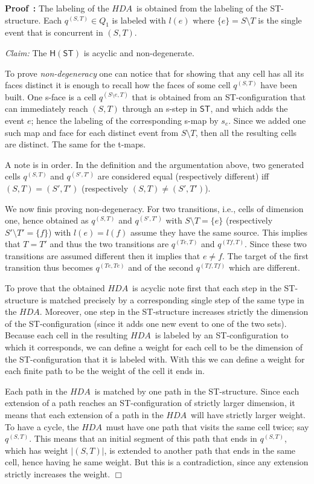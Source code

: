 \documentclass[submission,copyright,creativecommons]{eptcs}
\newenvironment{proof}[1][\!\!\,]{\vspace{1ex}\noindent\textbf{Proof #1: }}{\hfill$\Box$\vspace{2ex}}
\newcommand\HDA{\ensuremath{\mathit{HDA}}}
\newcommand\ST{\ensuremath{\mathsf{ST}}}
\newcommand\stintoh{\ensuremath{\mathsf{H}}}
\begin{document}
\begin{proof}
The labeling of the \HDA\ is obtained from the labeling of the ST-structure. Each $q^{(S,T)}\in Q_{1}$ is labeled with $l(e)$ where $\{e\}=S\setminus T$ is the single event that is concurrent in $(S,T)$.

\vspace{1ex}
\noindent\textit{Claim:}\hspace{1ex} The $\stintoh(\ST)$ is acyclic and non-degenerate.
\vspace{0.5ex}

To prove \textit{non-degeneracy} one can notice that for showing that any cell has all its faces distinct it is enough to recall how the faces of some cell $q^{(S,T)}$ have been built. One s-face is a cell $q^{(S\setminus e,T)}$ that is obtained from an ST-configuration that can immediately reach $(S,T)$ through an s-step in \ST, and which adds the event $e$; hence the labeling of the corresponding s-map by $s_{e}$. Since we added one such map and face for each distinct event from $S\setminus T$, then all the resulting cells are distinct. The same for the t-maps.

A note is in order. In the definition and the argumentation above, two generated cells $q^{(S,T)}$ and $q^{(S',T')}$ are considered equal (respectively different) iff $(S,T)=(S',T')$ (respectively $(S,T)\neq(S',T')$).

We now finis proving non-degeneracy. For two transitions, i.e., cells of dimension one, hence obtained as $q^{(S,T)}$ and $q^{(S',T')}$ with $S\setminus T=\{e\}$ (respectively $S'\setminus T'=\{f\}$) with $l(e)=l(f)$ assume they have the same source. This implies that $T=T'$ and thus the two transitions are $q^{(Te,T)}$ and $q^{(Tf,T)}$. Since these two transitions are assumed different then it implies that $e\neq f$. The target of the first transition thus becomes $q^{(Te,Te)}$ and of the second $q^{(Tf,Tf)}$ which are different.

To prove that the obtained \HDA\ is acyclic note first that each step in the ST-structure is matched precisely by a corresponding single step of the same type in the \HDA. Moreover, one step in the ST-structure increases strictly the dimension of the ST-configuration (since it adds one new event to one of the two sets).
Because each cell in the resulting \HDA\ is labeled by an ST-configuration to which it corresponds, we can define a weight for each cell to be the dimension of the ST-configuration that it is labeled with. With this we can define a weight for each finite path to be the weight of the cell it ends in.

Each path in the \HDA\ is matched by one path in the ST-structure. Since each extension of a path reaches an ST-configuration of strictly larger dimension, it means that each extension of a path in the \HDA\ will have strictly larger weight. To have a cycle, the \HDA\ must have one path that visits the same cell twice; say $q^{(S,T)}$. This means that an initial segment of this path that ends in $q^{(S,T)}$, which has weight $|(S,T)|$, is extended to another path that ends in the same cell, hence having he same weight. But this is a contradiction, since any extension strictly increases the weight.
\vspace{1ex}
\end{proof}
\end{document}
